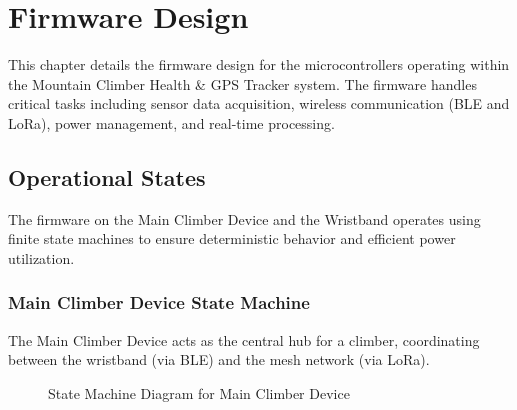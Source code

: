 \chapter{Firmware Design}
\label{ch:firmware_design}

This chapter details the firmware design for the microcontrollers operating within the Mountain Climber Health \& GPS Tracker system. The firmware handles critical tasks including sensor data acquisition, wireless communication (BLE and LoRa), power management, and real-time processing.

\section{Operational States}

The firmware on the Main Climber Device and the Wristband operates using finite state machines to ensure deterministic behavior and efficient power utilization.

\subsection{Main Climber Device State Machine}

The Main Climber Device acts as the central hub for a climber, coordinating between the wristband (via BLE) and the mesh network (via LoRa).

\begin{figure}[htbp]
    \centering
    \caption{State Machine Diagram for Main Climber Device}
    \label{fig:main_state_machine}
\end{figure}


